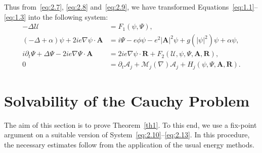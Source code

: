 \documentclass[AHL,Unicode,longabstracts]{cedram}
\newcommand{\BA}{\mathbf{A}}
\newcommand{\BR}{\mathbf{R}}
\begin{document}
Thus from~\eqref{eq:2.7}, \eqref{eq:2.8} and~\eqref{eq:2.9}, we have transformed Equations~\eqref{eq:1.1}--\eqref{eq:1.3} into the following system:
\begin{align}
-\Delta \mathcal{U} &= F_1(\psi,\Psi), \label{eq:2.10}
\\
(-\Delta+\alpha)\psi + 2 ie \nabla \psi\cdot \BA &= i \Psi-e\phi \psi -e^2 |\BA|^2 \psi +g(|\psi|^2)\psi+\alpha \psi, \label{eq:2.11}
\\
i\partial_t \Psi +\Delta \Psi -2i e \nabla \Psi \cdot \BA &= 2ie \nabla\psi \cdot \BR +F_2(\mathcal{U},\psi,\Psi,\BA,\BR), \label{eq:2.12}
\\
0&=\partial_t \mathcal{A}_j+\mathcal{M}_j(\nabla)\mathcal{A}_j +H_j(\psi,\Psi,\BA,\BR). \label{eq:2.13}
\end{align}


\section{Solvability of the Cauchy Problem}\label{sec3}

The aim of this section is to prove Theorem~\ref{th1}. To this end, we use a fix-point argument on a suitable version of System~\eqref{eq:2.10}--\eqref{eq:2.13}. In this procedure, the necessary estimates follow from the application of the usual energy methods.
\end{document}
